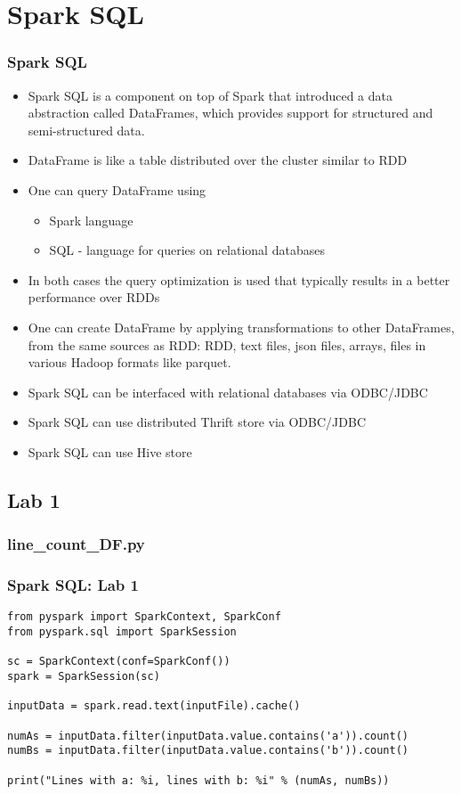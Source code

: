 \section{Spark SQL}

\begin{frame}[fragile]
  \frametitle{Spark SQL}
  
  \begin{itemize}
  \item {\color{mycolordef}Spark SQL} is a component on top of Spark that introduced a data abstraction called {\color{mycolordef}DataFrames}, which provides support for structured and semi-structured data. 
  \item DataFrame is like a table distributed over the cluster similar to RDD
  \item One can query DataFrame using 
    \begin{itemize}
    \item Spark language
    \item SQL - language for queries on relational databases
    \end{itemize}
  \item In both cases the query optimization is used that typically results in a better performance over RDDs
  \item One can create DataFrame by applying transformations to other DataFrames, from the same sources as RDD: RDD, text files, json files, arrays, files in various Hadoop formats like parquet.
  \item Spark SQL can be interfaced with relational databases via ODBC/JDBC
  \item Spark SQL can use distributed Thrift store via ODBC/JDBC
  \item Spark SQL can use Hive store
  \end{itemize}
\end{frame}

\subsection{Lab 1}
\subsubsection{line\_count\_DF.py}
\begin{frame}[fragile]
  \frametitle{Spark SQL: Lab 1}
{\small
{\color{mycolorcode}
\begin{verbatim}
from pyspark import SparkContext, SparkConf
from pyspark.sql import SparkSession

sc = SparkContext(conf=SparkConf())
spark = SparkSession(sc)

inputData = spark.read.text(inputFile).cache()

numAs = inputData.filter(inputData.value.contains('a')).count()
numBs = inputData.filter(inputData.value.contains('b')).count()

print("Lines with a: %i, lines with b: %i" % (numAs, numBs))
\end{verbatim}
}
}
\end{frame}

